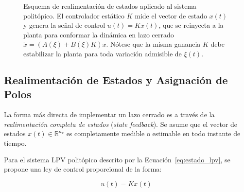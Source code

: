 \begin{figure}[ht]
    \centering
    \caption{Esquema de realimentación de estados aplicado al sistema politópico. El controlador estático $K$ mide el vector de estado $x(t)$ y genera la señal de control $u(t)=Kx(t)$, que se reinyecta a la planta para conformar la dinámica en lazo cerrado $\dot{x}=(A(\xi)+B(\xi)K)x$. Nótese que la misma ganancia $K$ debe estabilizar la planta para toda variación admisible de $\xi(t)$.}
    \label{fig:realimentacion}
\end{figure}

\subsection{Realimentación de Estados y Asignación de Polos}

La forma más directa de implementar un lazo cerrado es a través de la \textit{realimentación completa de estados} (\textit{state feedback}). Se asume que el vector de estados $x(t) \in \mathbb{R}^{n_x}$ es completamente medible o estimable en todo instante de tiempo.

Para el sistema LPV politópico descrito por la Ecuación~\eqref{eq:estado_lpv}, se propone una ley de control proporcional de la forma:

\begin{equation}
    u(t) = K x(t)
    \label{eq:ley_control}
\end{equation}

